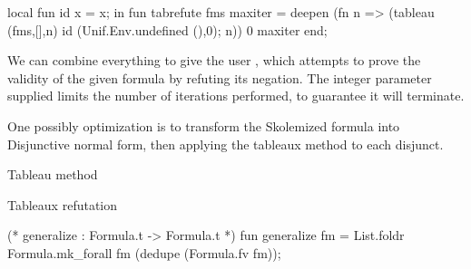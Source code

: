local
  fun id x = x;
in
fun tabrefute fms maxiter =
  deepen (fn n =>
             (tableau (fms,[],n)
                      id
                      (Unif.Env.undefined (),0);
              n))
         0
         maxiter
end;
\nwendcode{}\nwdocspar

\begin{node}
We can combine everything to give the user {\Tt{}\nwendquote}, which
attempts to prove the validity of the given formula by refuting its
negation. The integer parameter supplied limits the number of
iterations performed, to guarantee it will terminate.

One possibly optimization is to transform the Skolemized formula into
Disjunctive normal form, then applying the tableaux method to each
disjunct.
\end{node}

\nwenddocs{}\endmoddef\nwstartdeflinemarkup{}\nwenddeflinemarkup
\LA{}Tableau method~{\nwtagstyle{}}\RA{}

\LA{}Tableaux refutation~{\nwtagstyle{}}\RA{}

(* generalize : Formula.t -> Formula.t *)
fun generalize fm =
  List.foldr Formula.mk_forall fm (dedupe (Formula.fv fm));


